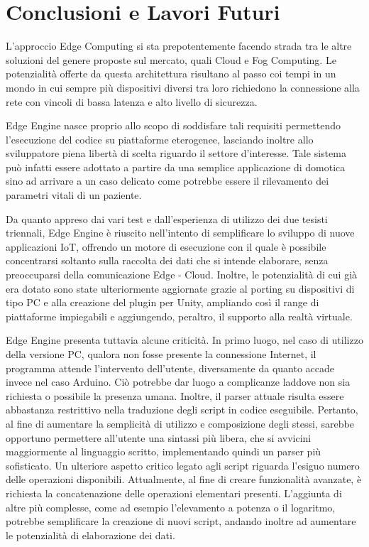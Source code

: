 \chapter{Conclusioni e Lavori Futuri}
L’approccio Edge Computing si sta prepotentemente facendo strada tra le altre soluzioni del genere proposte sul mercato, quali Cloud e Fog Computing. Le potenzialità offerte da questa architettura risultano al passo coi tempi in un mondo in cui sempre più dispositivi diversi tra loro richiedono la connessione alla rete con vincoli di bassa latenza e alto livello di sicurezza. 

Edge Engine nasce proprio allo scopo di soddisfare tali requisiti permettendo l’esecuzione del codice su piattaforme eterogenee, lasciando inoltre allo sviluppatore piena libertà di scelta riguardo il settore d’interesse. Tale sistema può infatti essere adottato a partire da una semplice applicazione di domotica sino ad arrivare a un caso delicato come potrebbe essere il rilevamento dei parametri vitali di un paziente.

Da quanto appreso dai vari test e dall'esperienza di utilizzo dei due tesisti triennali, Edge Engine è riuscito nell’intento di semplificare lo sviluppo di nuove applicazioni IoT, offrendo un motore di esecuzione con il quale è possibile concentrarsi soltanto sulla raccolta dei dati che si intende elaborare, senza preoccuparsi della comunicazione Edge - Cloud.  Inoltre, le potenzialità di cui già era dotato sono state ulteriormente aggiornate grazie al porting su dispositivi di tipo PC e alla creazione del plugin per Unity, ampliando così il range di piattaforme impiegabili e aggiungendo, peraltro, il supporto alla realtà virtuale.

Edge Engine presenta tuttavia alcune criticità. In primo luogo, nel caso di utilizzo della versione PC, qualora non fosse presente la connessione Internet, il programma attende l’intervento dell'utente, diversamente da quanto accade invece nel caso Arduino. Ciò potrebbe dar luogo a complicanze laddove non sia richiesta o possibile la presenza umana. Inoltre, il parser attuale risulta essere abbastanza restrittivo nella traduzione degli script in codice eseguibile. Pertanto, al fine di aumentare la semplicità di utilizzo e composizione degli stessi, sarebbe opportuno permettere all'utente una sintassi più libera, che si avvicini maggiormente al linguaggio scritto, implementando quindi un parser più sofisticato. Un ulteriore aspetto critico legato agli script riguarda l’esiguo numero delle operazioni disponibili. Attualmente, al fine di creare funzionalità avanzate, è richiesta la concatenazione delle operazioni elementari presenti. L’aggiunta di altre più complesse, come ad esempio l’elevamento a potenza o il logaritmo, potrebbe semplificare la creazione di nuovi script, andando inoltre ad aumentare le potenzialità di elaborazione dei dati.


